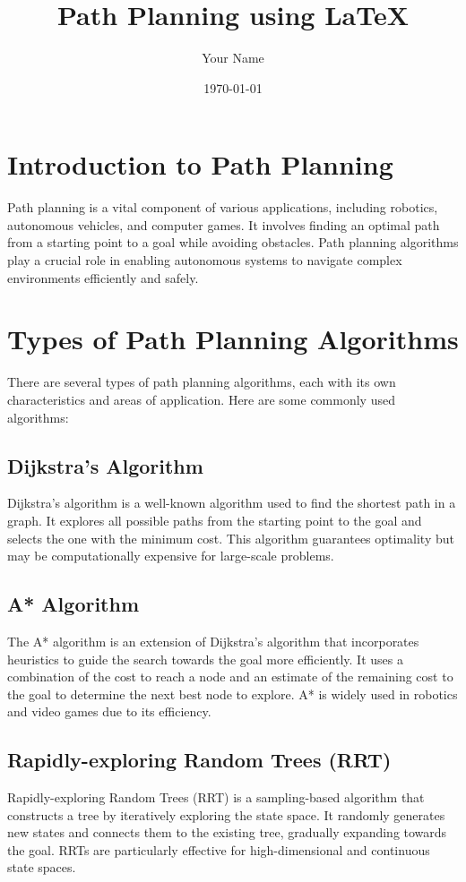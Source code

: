 \documentclass{article}
\title{Path Planning using \LaTeX}
\author{Your Name}
\date{\today}
\begin{document}
 
 
\maketitle 
 
\section{Introduction to Path Planning} 
Path planning is a vital component of various applications, including robotics, autonomous vehicles, and computer games. It involves finding an optimal path from a starting point to a goal while avoiding obstacles. Path planning algorithms play a crucial role in enabling autonomous systems to navigate complex environments efficiently and safely. 
 
\section{Types of Path Planning Algorithms} 
There are several types of path planning algorithms, each with its own characteristics and areas of application. Here are some commonly used algorithms: 
\subsection{Dijkstra's Algorithm} 
Dijkstra's algorithm is a well-known algorithm used to find the shortest path in a graph. It explores all possible paths from the starting point to the goal and selects the one with the minimum cost. This algorithm guarantees optimality but may be computationally expensive for large-scale problems. 
 
\subsection{A* Algorithm} 
The A* algorithm is an extension of Dijkstra's algorithm that incorporates heuristics to guide the search towards the goal more efficiently. It uses a combination of the cost to reach a node and an estimate of the remaining cost to the goal to determine the next best node to explore. A* is widely used in robotics and video games due to its efficiency. 
 
\subsection{Rapidly-exploring Random Trees (RRT)} 
Rapidly-exploring Random Trees (RRT) is a sampling-based algorithm that constructs a tree by iteratively exploring the state space. It randomly generates new states and connects them to the existing tree, gradually expanding towards the goal. RRTs are particularly effective for high-dimensional and continuous state spaces. 
 
\end{document}
